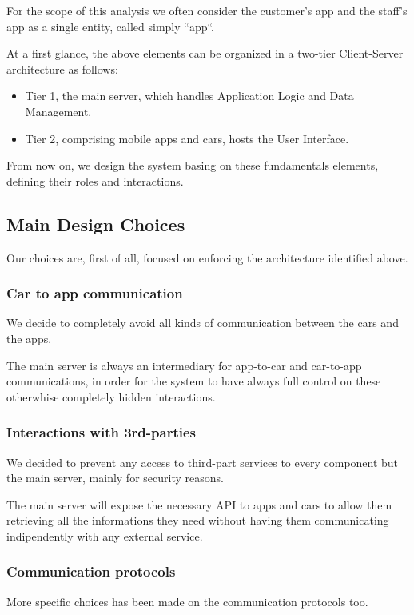\documentclass[11pt]{article} %
\begin{document}
\begin{description}
For the scope of this analysis we often consider the customer's app and the staff's app as a single entity, called simply ``app``.

At a first glance, the above elements can be organized in a two-tier Client-Server architecture as follows:
\begin{itemize}[noitemsep]
	\item Tier 1, the main server, which handles Application Logic and Data Management.
	\item Tier 2, comprising mobile apps and cars, hosts the User Interface.
\end{itemize}
From now on, we design the system basing on these fundamentals elements, defining their roles and interactions.


\subsection{Main Design Choices}

Our choices are, first of all, focused on enforcing the architecture identified above. 

\subsubsection{Car to app communication}
We decide to completely avoid all kinds of communication between the cars and the apps. 

 The main server is always an intermediary for app-to-car and car-to-app communications, in order for the system to have always full control on these otherwhise completely hidden interactions.

\subsubsection{Interactions with 3rd-parties}
We decided to prevent any access to third-part services to every component but the main server, mainly for security reasons.

The main server will expose the necessary API to apps and cars to allow them retrieving all the informations they need without having them communicating indipendently with any external service.

\subsubsection{Communication protocols}
More specific choices has been made on the communication protocols too.


\end{description}
\end{document}
